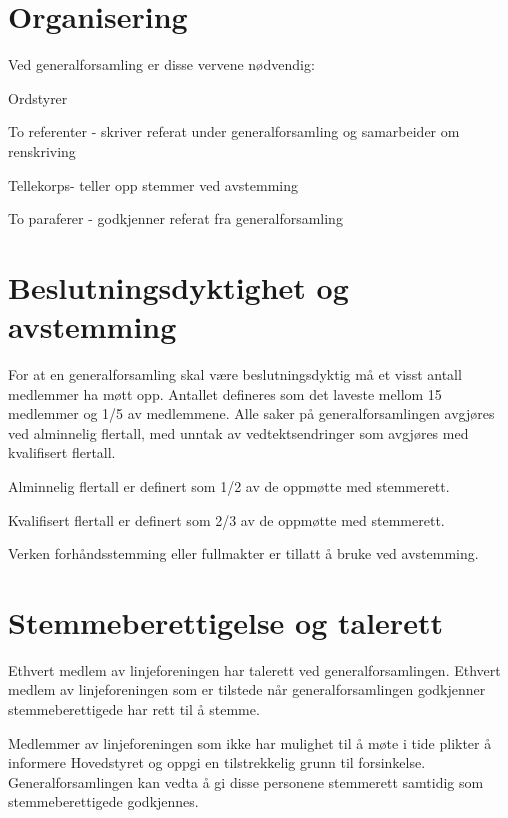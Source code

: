 \section{Organisering}
\label{sec:organisering}
Ved generalforsamling er disse vervene nødvendig: 

\begin{liste}
	\item Ordstyrer
	\item To referenter - skriver referat under generalforsamling og samarbeider om \mbox{renskriving}
	\item Tellekorps\space \space \space \space - teller opp stemmer ved avstemming
	\item To paraferer - godkjenner referat fra generalforsamling
	
\end{liste}

\newpage
\section{Beslutningsdyktighet og avstemming}

For at en generalforsamling skal være beslutningsdyktig må et visst antall medlemmer ha møtt opp. Antallet defineres som det laveste mellom 15 medlemmer og 1/5 av medlemmene. Alle saker på generalforsamlingen avgjøres ved alminnelig flertall, med unntak av vedtektsendringer som avgjøres med kvalifisert flertall.

\begin{liste}
	\item Alminnelig flertall er definert som 1/2 av de oppmøtte med stemmerett.
	\item Kvalifisert flertall er definert som 2/3 av de oppmøtte med stemmerett.
\end{liste}

Verken forhåndsstemming eller fullmakter er tillatt å bruke ved avstemming.

\section{Stemmeberettigelse og talerett}
Ethvert medlem av linjeforeningen har talerett ved generalforsamlingen.\newline
Ethvert medlem av linjeforeningen som er tilstede når generalforsamlingen godkjenner stemmeberettigede har rett til å stemme.\newline

Medlemmer av linjeforeningen som ikke har mulighet til å møte i tide plikter å informere Hovedstyret og oppgi en tilstrekkelig grunn til forsinkelse. Generalforsamlingen kan vedta å gi disse personene stemmerett samtidig som stemmeberettigede godkjennes.

